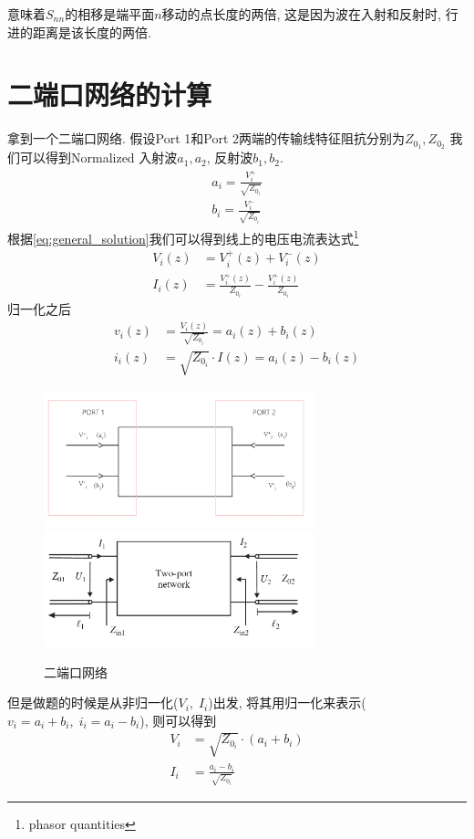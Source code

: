 \documentclass[a4paper]{report}
\begin{document}
意味着$S_{nn}$的相移是端平面$n$移动的点长度的两倍, 这是因为波在入射和反射时, 行进的距离是该长度的两倍. 

\section{二端口网络的计算}
拿到一个二端口网络. 
假设Port 1和Port 2两端的传输线特征阻抗分别为$Z_{0_1},Z_{0_2}$
我们可以得到Normalized 入射波$a_1,a_2$, 反射波$b_1,b_2$. 
\begin{align*}
  a_i=\frac{V^+_i}{\sqrt{Z_{0_i}}}
  \\b_i=\frac{V^-_i}{\sqrt{Z_{0_i}}}
\end{align*}
根据\ref{eq:general_solution}我们可以得到线上的电压电流表达式\footnote{phasor quantities}
\begin{align}
  V_i(z)&=V^+_i(z) +V^-_i(z)
  \\I_i(z)&=\frac{V^+_i(z)}{Z_{0_i}}-\frac{V^+_i(z)}{Z_{0_i}}
\end{align}
归一化之后
\begin{align}
  v_i(z)&=\frac{V_i(z)}{\sqrt{Z_{0_i}}}=a_i(z)+b_i(z)
  \\i_i(z)&=\sqrt{Z_{0_i}}\cdot I(z)=a_i(z)-b_i(z)
\end{align}
\begin{figure}[H]
\centering
\includegraphics[width=0.7\textwidth]{two_terminal_a.png}
\includegraphics[width=0.7\textwidth]{two_terminal_b.png}
\caption{二端口网络}
\end{figure}
但是做题的时候是从非归一化($V_i,\; I_i$)出发, 将其用归一化来表示($v_i=a_i+b_i,\; i_i=a_i-b_i$), 则可以得到
\begin{align}
  V_i&=\sqrt{Z_{0_i}}\cdot (a_i+b_i)
  \\I_i&=\frac{a_i-b_i}{\sqrt{Z_{0_i}}}
\end{align}
\end{document}
